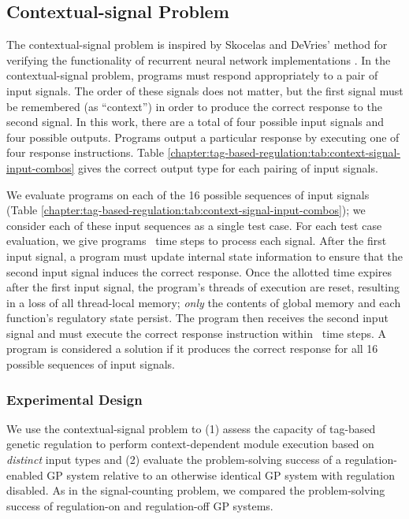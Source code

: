 \subsection{Contextual-signal Problem}
\label{chapter:tag-based-regulation:sec:methods:contextual-signal-problem}

The contextual-signal problem is inspired by Skocelas and DeVries' method for verifying the functionality of recurrent neural network implementations \citep{skocelas_test_2020}. 
In the contextual-signal problem, programs must respond appropriately to a pair of input signals.
The order of these signals does not matter, but the first signal must be remembered (as ``context'') in order to produce the correct response to the second signal.
In this work, there are a total of four possible input signals and four possible outputs.
Programs output a particular response by executing one of four response instructions. 
Table \ref{chapter:tag-based-regulation:tab:context-signal-input-combos} gives the correct output type for each pairing of input signals. 

 

We evaluate programs on each of the 16 possible sequences of input signals (Table \ref{chapter:tag-based-regulation:tab:context-signal-input-combos}); we consider each of these input sequences as a single test case.
For each test case evaluation, we give programs \ContextSigTaskCpuTimePerSignal\ time steps to process each signal.
After the first input signal, a program must update internal state information to ensure that the second input signal induces the correct response.  
Once the allotted time expires after the first input signal, the program's threads of execution are reset, resulting in a loss of all thread-local memory; \textit{only} the contents of global memory and each function's regulatory state persist. 
The program then receives the second input signal and must execute the correct response instruction within \ContextSigTaskCpuTimePerSignal\ time steps.
A program is considered a solution if it produces the correct response for all 16 possible sequences of input signals.

\subsubsection{Experimental Design}

We use the contextual-signal problem to
(1) assess the capacity of tag-based genetic regulation to perform context-dependent module execution based on \textit{distinct} input types
and
(2) evaluate the problem-solving success of a regulation-enabled GP system relative to an otherwise identical GP system with regulation disabled.
As in the signal-counting problem, we compared the problem-solving success of regulation-on and regulation-off GP systems.

